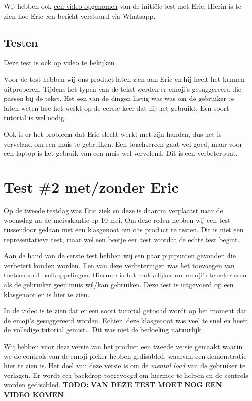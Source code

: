 \documentclass[12pt]{article}
\begin{document}
Wij hebben ook \href{https://cdn.nicecock.eu/hcd/hcd/Attachments/initiele-test-stuur-bericht.mp4}{een video opgenomen} van de initiële test met Eric.
Hierin is te zien hoe Eric een bericht verstuurd via Whatsapp.

\subsection{Testen}

Deze test is ook \href{https://cdn.nicecock.eu/hcd/hcd/Attachments/test-not-working-ai.mp4}{op video} te bekijken. 

Voor de test hebben wij ons product laten zien aan Eric en hij heeft het kunnen uitproberen.
Tijdens het typen van de tekst werden er emoji's gesuggereerd die passen bij de tekst.
Het een van de dingen lastig was was om de gebruiker te laten weten hoe het werkt op de eerste keer dat hij het gebruikt.
Een soort tutorial is wel nodig.

Ook is er het probleem dat Eric slecht werkt met zijn handen, dus het is vervelend om een muis te gebruiken.
Een touchscreen gaat wel goed, maar voor een laptop is het gebruik van een muis wel vervelend.
Dit is een verbeterpunt.

\section{Test \#2 met/zonder Eric}

Op de tweede testdag was Eric ziek en deze is daarom verplaatst naar de woensdag na de meivakantie op 10 mei.
Om deze reden hebben wij een test tussendoor gedaan met een klasgenoot om ons product te testen.
Dit is niet een representatieve test, maar wel een beetje een test voordat de echte test begint.

Aan de hand van de eerste test hebben wij een paar pijnpunten gevonden die verbetert konden worden.
Een van deze verbeteringen was het toevoegen van toetsenbord snelkoppelingen.
Hiermee is het makkelijker om emoji's te selecteren als de gebruiker geen muis wil/kan gebruiken.
Deze test is uitgevoerd op een klasgenoot en is \href{https://cdn.nicecock.eu/hcd/hcd/Attachments/kb-shortcut-test-ting.mp4}{hier} te zien.

In de video is te zien dat er een soort tutorial getoond wordt op het moment dat de emoji's gesuggereerd worden.
Echter, deze klasgenoot was veel te snel en heeft de volledige tutorial gemist\dots
Dit was niet de bedoeling natuurlijk.

Wij hebben voor deze versie van het product een tweede versie gemaakt waarin we de controls van de emoji picker hebben gedisabled, waarvan een demonstratie \href{https://cdn.nicecock.eu/hcd/hcd/Attachments/kb-shortcuts-disable-ui.mov}{hier} te zien is.
Het doel van deze versie is om de \textit{mental load} van de gebruiker te verlagen.
Er wordt een backdrop toegevoegd om hiermee te helpen en de controls worden gedisabled.
\colorbox{red!30}{\textbf{TODO: VAN DEZE TEST MOET NOG EEN VIDEO KOMEN}}
\end{document}
